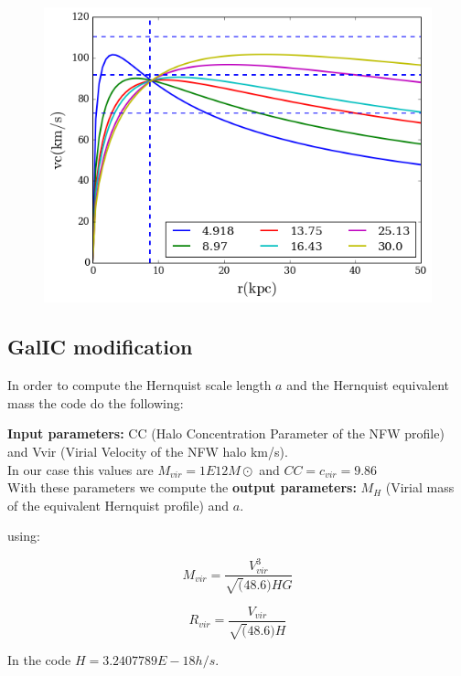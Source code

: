 \begin{figure}[H]{\label{fig:LMC_rotcurve}}
\centering
\includegraphics[scale=0.4]{LMC_rotcurve_hernquist_2.png}
\end{figure}

\subsection{GalIC modification}

In order to compute the Hernquist scale length $a$ and the Hernquist equivalent mass 
the code do the following:

\textbf{Input parameters:} CC (Halo Concentration Parameter of the NFW profile) and Vvir (Virial Velocity of the NFW halo km/s).\\
In our case this values are $M_{vir} = 1E12 M\odot$ and $CC = c_{vir} = 9.86$ \\
With these parameters we compute the \textbf{output parameters:} $M_H$ (Virial mass of the equivalent Hernquist profile) and $a$.

using:

\begin{equation}
M_{vir} = \dfrac{V_{vir}^3}{\sqrt(48.6) H G}
\end{equation}

\begin{equation}
R_{vir} = \dfrac{V_{vir}}{\sqrt(48.6)H}
\end{equation}

In the code $H = 3.2407789E-18 h / s$. \\

